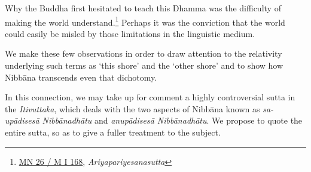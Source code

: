Why the Buddha first hesitated to teach this Dhamma was the difficulty of making the world understand.\footnote{\href{https://suttacentral.net/mn26/pli/ms}{MN 26 / M I 168}, \emph{Ariyapariyesanasutta}} Perhaps it was the conviction that the world could easily be misled by those limitations in the linguistic medium.

We make these few observations in order to draw attention to the relativity underlying such terms as `this shore' and the `other shore' and to show how Nibbāna transcends even that dichotomy.

In this connection, we may take up for comment a highly controversial sutta in the \emph{Itivuttaka}, which deals with the two aspects of Nibbāna known as \emph{sa-upādisesā Nibbānadhātu} and \emph{anupādisesā Nibbānadhātu}. We propose to quote the entire sutta, so as to give a fuller treatment to the subject.


